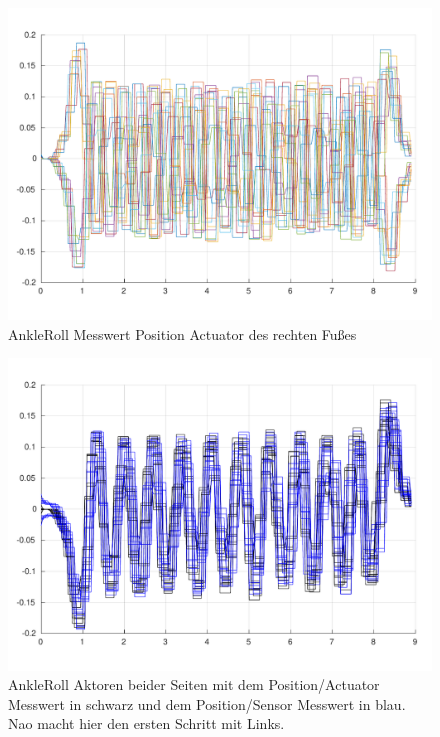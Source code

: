 \begin{figure}[tb]
	\centering
	\includegraphics[width=1\linewidth]{Bilder/AnkleRoll_rechts_act.pdf}
	\caption{AnkleRoll Messwert Position Actuator des rechten Fußes}
	\label{AnkleRoll_rechts_act}
\end{figure}
\begin{figure}[tb]
	\centering
	\includegraphics[width=1\linewidth]{Bilder/AnkleRoll_beide_act_sens_links_anfang.pdf}
	\caption{AnkleRoll Aktoren beider Seiten mit dem Position/Actuator Messwert in schwarz und dem Position/Sensor Messwert in blau. Nao macht hier den ersten Schritt mit Links.}
	\label{AnkleRoll_beide_act_sens_links_anfang}
\end{figure}
